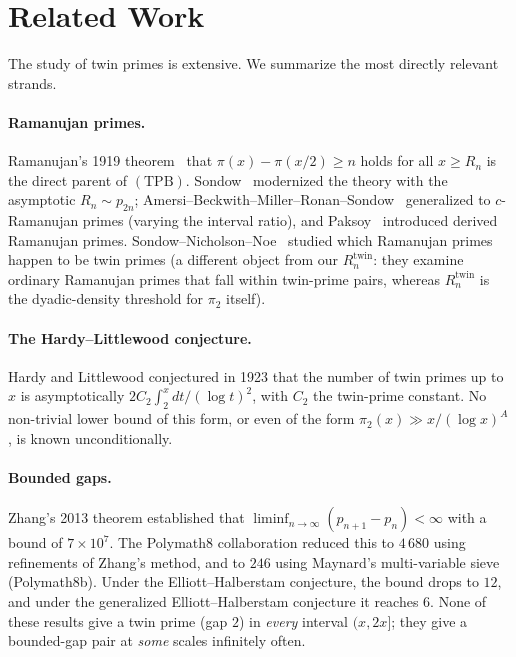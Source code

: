 \documentclass[11pt]{article}
\begin{document}
\section{Related Work}\label{sec:lit}

The study of twin primes is extensive. We summarize the most directly
relevant strands.

\paragraph{Ramanujan primes.}
Ramanujan's 1919 theorem~\cite{Ramanujan1919} that
$\pi(x)-\pi(x/2)\ge n$ holds for all $x\ge R_n$ is the direct parent
of $(\mathrm{TPB})$. Sondow~\cite{Sondow2009} modernized the theory
with the asymptotic $R_n\sim p_{2n}$;
Amersi--Beckwith--Miller--Ronan--Sondow~\cite{Amersi2014}
generalized to $c$-Ramanujan primes (varying the interval ratio), and
Paksoy~\cite{Paksoy2012} introduced derived Ramanujan primes.
Sondow--Nicholson--Noe~\cite{SondowNicholsonNoe2011} studied which
Ramanujan primes happen to be twin primes (a different object from
our $R^{\mathrm{twin}}_n$: they examine ordinary Ramanujan primes
that fall within twin-prime pairs, whereas $R^{\mathrm{twin}}_n$ is
the dyadic-density threshold for $\pi_2$ itself).

\paragraph{The Hardy--Littlewood conjecture.}
Hardy and Littlewood conjectured in 1923 that the number of twin
primes up to $x$ is asymptotically
$2C_2\int_2^x dt/(\log t)^2$, with $C_2$ the twin-prime constant. No
non-trivial lower bound of this form, or even of the form
$\pi_2(x)\gg x/(\log x)^A$, is known unconditionally.

\paragraph{Bounded gaps.}
Zhang's 2013 theorem established that
$\liminf_{n\to\infty}(p_{n+1}-p_n)<\infty$ with a bound of
$7\times 10^7$. The Polymath8 collaboration reduced this to $4\,680$
using refinements of Zhang's method, and to $246$ using Maynard's
multi-variable sieve (Polymath8b). Under the Elliott--Halberstam
conjecture, the bound drops to $12$, and under the generalized
Elliott--Halberstam conjecture it reaches $6$. None of these results
give a twin prime (gap $2$) in \emph{every} interval $(x,2x]$; they
give a bounded-gap pair at \emph{some} scales infinitely often.
\end{document}
